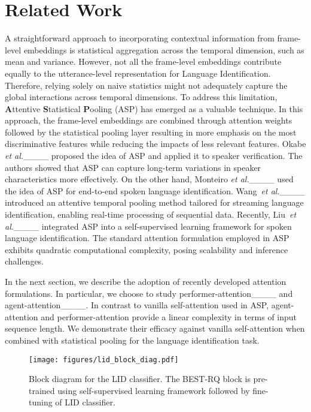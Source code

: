 \section{Related Work}
A straightforward approach to incorporating contextual information from frame-level embeddings is statistical aggregation across the temporal dimension, such as mean and variance. 
However, not all the frame-level embeddings contribute equally to the utterance-level representation for Language Identification. Therefore, relying solely on naive statistics might not adequately capture the global interactions across temporal dimensions. 
To address this limitation, \textbf{A}ttentive \textbf{S}tatistical \textbf{P}ooling (ASP) has emerged as a valuable technique.
In this approach, the frame-level embeddings are combined through attention weights followed by the statistical pooling layer resulting in more emphasis on the most discriminative features while reducing the impacts of less relevant features.  
Okabe \emph{et al.}____ proposed the idea of ASP and applied it to speaker verification.
The authors showed that ASP can capture long-term variations in speaker characteristics more effectively. 
On the other hand, Monteiro \emph{et al.}____ used the idea of ASP for end-to-end spoken language identification.
Wang~\emph{et al.}____ introduced an attentive temporal pooling method tailored for streaming language identification, enabling real-time processing of sequential data. 
Recently, Liu~\emph{et al.}____ integrated ASP into a self-supervised learning framework for spoken language identification. 
The standard attention formulation employed in ASP exhibits quadratic computational complexity, posing scalability and inference challenges.\par  
In the next section, we describe the adoption of recently developed attention formulations.
In particular, we choose to study performer-attention____ and agent-attention____.
In contrast to vanilla self-attention used in ASP, agent-attention and performer-attention provide a linear complexity in terms of input sequence length.
We demonstrate their efficacy against vanilla self-attention when combined with statistical pooling for the language identification task.
\begin{figure}[!t]
    \centering
    \texttt{[image: figures/lid\_block\_diag.pdf]}
    \caption{Block diagram for the LID classifier. The BEST-RQ block is pre-trained using self-supervised learning framework followed by fine-tuning of LID classifier.}
    \label{fig:lid_block}
\end{figure}